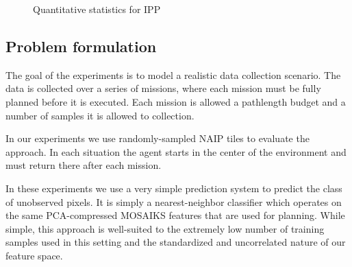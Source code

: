 \begin{figure}[h]
    \hfill
    \hfill
    \caption{Quantitative statistics for IPP}
    \label{fig:res_ipp_quant}
\end{figure}

\subsection{Problem formulation}
The goal of the experiments is to model a realistic data collection scenario. The data is collected over a series of missions, where each mission must be fully planned before it is executed. Each mission is allowed a pathlength budget and a number of samples it is allowed to collection. 

In our experiments we use randomly-sampled NAIP tiles to evaluate the approach. In each situation the agent starts in the center of the environment and must return there after each mission.

In these experiments we use a very simple prediction system to predict the class of unobserved pixels. It is simply a nearest-neighbor classifier which operates on the same PCA-compressed MOSAIKS features that are used for planning. While simple, this approach is well-suited to the extremely low number of training samples used in this setting and the standardized and uncorrelated nature of our feature space.

